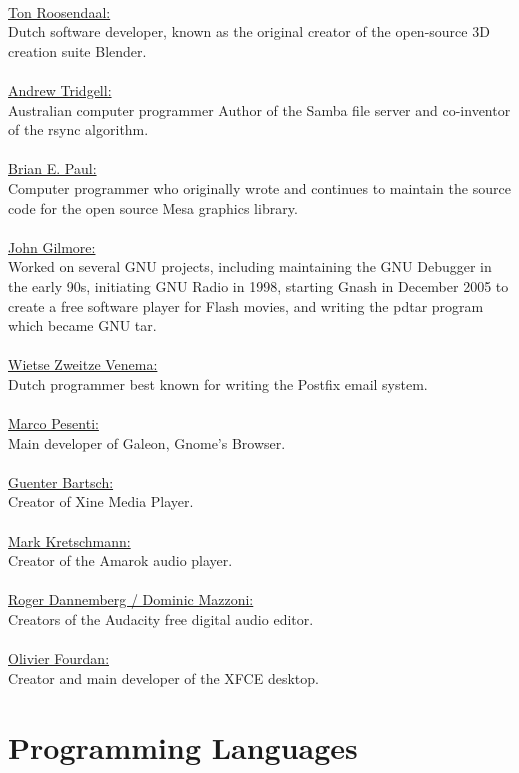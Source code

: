 \documentclass[10pt, a4paper, oneside]{report}
\begin{document}
\\
\underline{Ton Roosendaal:}\\
Dutch software developer, known as the original creator of the open-source 3D creation suite Blender.\\
\\
\underline{Andrew Tridgell:}\\
Australian computer programmer Author of the Samba file server and co-inventor of the rsync algorithm.\\
\\
\underline{Brian E. Paul:}\\
Computer programmer who originally wrote and continues to maintain the source code for the open source Mesa graphics library.\\
\\
\underline{John Gilmore:}\\
Worked on several GNU projects, including maintaining the GNU Debugger in the early 90s, initiating GNU Radio in 1998, starting Gnash in December 2005 to create a free software player for Flash movies, and writing the pdtar program which became GNU tar.\\
\\
\underline{Wietse Zweitze Venema:}\\
Dutch programmer best known for writing the Postfix email system.\\
\\
\underline{Marco Pesenti:}\\
Main developer of Galeon, Gnome's Browser.\\
\\
\underline{Guenter Bartsch:}\\
Creator of Xine Media Player.\\
\\
\underline{Mark Kretschmann:}\\
Creator of the Amarok audio player.\\
\\
\underline{Roger Dannemberg / Dominic Mazzoni:}\\
Creators of the Audacity free digital audio editor.\\
\\
\underline{Olivier Fourdan:}\\
Creator and main developer of the XFCE desktop.\\

\section* {Programming Languages}
\end{document}
